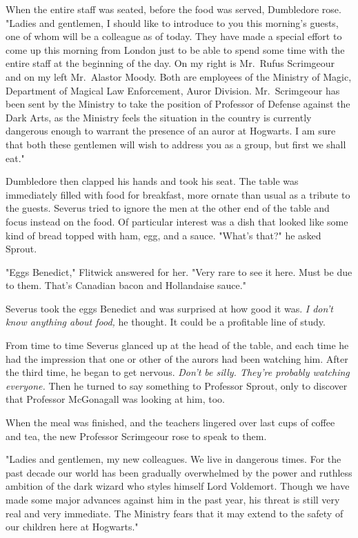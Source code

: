 When the entire staff was seated, before the food was served, Dumbledore rose. "Ladies and gentlemen, I should like to introduce to you this morning's guests, one of whom will be a colleague as of today. They have made a special effort to come up this morning from London just to be able to spend some time with the entire staff at the beginning of the day. On my right is Mr.~Rufus Scrimgeour and on my left Mr.~Alastor Moody. Both are employees of the Ministry of Magic, Department of Magical Law Enforcement, Auror Division. Mr.~Scrimgeour has been sent by the Ministry to take the position of Professor of Defense against the Dark Arts, as the Ministry feels the situation in the country is currently dangerous enough to warrant the presence of an auror at Hogwarts. I am sure that both these gentlemen will wish to address you as a group, but first we shall eat."

Dumbledore then clapped his hands and took his seat. The table was immediately filled with food for breakfast, more ornate than usual as a tribute to the guests. Severus tried to ignore the men at the other end of the table and focus instead on the food. Of particular interest was a dish that looked like some kind of bread topped with ham, egg, and a sauce. "What's that?" he asked Sprout.

"Eggs Benedict," Flitwick answered for her. "Very rare to see it here. Must be due to them. That's Canadian bacon and Hollandaise sauce."

Severus took the eggs Benedict and was surprised at how good it was. \emph{I don't know anything about food,} he thought. It could be a profitable line of study.

From time to time Severus glanced up at the head of the table, and each time he had the impression that one or other of the aurors had been watching him. After the third time, he began to get nervous. \emph{Don't be silly. They're probably watching everyone.} Then he turned to say something to Professor Sprout, only to discover that Professor McGonagall was looking at him, too.

When the meal was finished, and the teachers lingered over last cups of coffee and tea, the new Professor Scrimgeour rose to speak to them.

"Ladies and gentlemen, my new colleagues. We live in dangerous times. For the past decade our world has been gradually overwhelmed by the power and ruthless ambition of the dark wizard who styles himself Lord Voldemort. Though we have made some major advances against him in the past year, his threat is still very real and very immediate. The Ministry fears that it may extend to the safety of our children here at Hogwarts."

